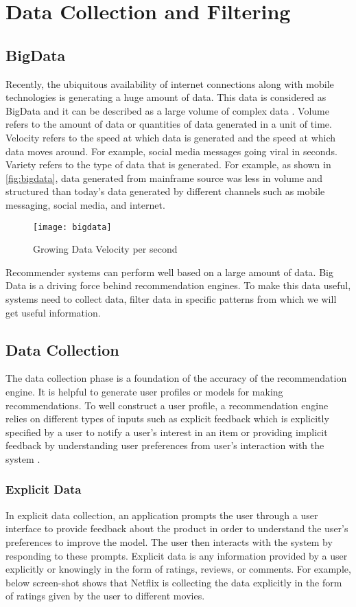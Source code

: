 
\section{Data Collection and Filtering}
\subsection{BigData}
Recently, the ubiquitous availability of internet connections along with mobile technologies is generating a huge amount of data. This data is considered as BigData and it can be described as a large volume of complex data \cite{2}. Volume refers to the amount of data or quantities of data generated in a unit of time. Velocity refers to the speed at which data is generated and the speed at which data moves around. For example, social media messages going viral in seconds. Variety refers to the type of data that is generated. For example, as shown in \autoref{fig:bigdata}, data generated from mainframe source was less in volume and structured than today's data generated by different channels such as mobile messaging, social media, and internet.
\\
\begin{figure}[H]
	\centering
	\texttt{[image: bigdata]}
	\caption{Growing Data Velocity per second}
	\label{fig:bigdata}
\end{figure}

\noindent Recommender systems can perform well based on a large amount of data. Big Data is a driving force behind recommendation engines.
To make this data useful, systems need to collect data, filter data in specific patterns from which we will get useful information. 

\subsection{Data Collection}

The data collection phase is a foundation of the accuracy of the recommendation engine. It is helpful to generate user profiles or models for making recommendations. To well construct a user profile, a recommendation engine relies on different types of inputs such as explicit feedback which is explicitly specified by a user to notify a user's interest in an item or providing implicit feedback by understanding user preferences from user's interaction with the system \cite{34}. 

\subsubsection{Explicit Data}
In explicit data collection, an application prompts the user through a user interface to provide feedback about the product in order to understand the user's preferences to improve the model. The user then interacts with the system by responding to these prompts. Explicit data is any information provided by a user explicitly or knowingly in the form of ratings, reviews, or comments. For example, below screen-shot shows that Netflix is collecting the data explicitly in the form of ratings given by the user to different movies. 
\\


